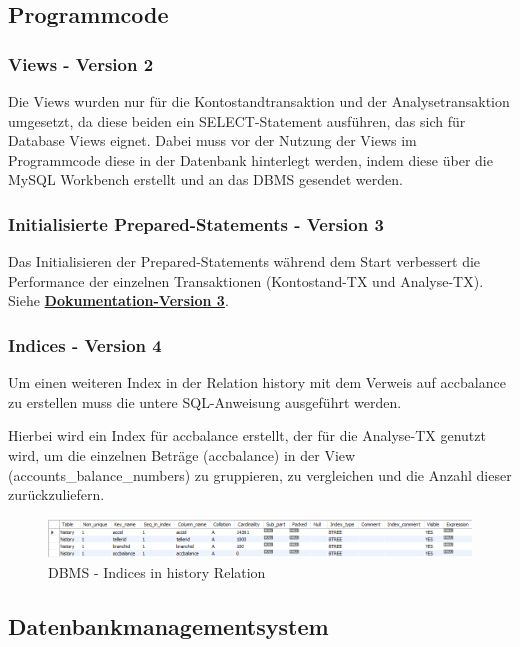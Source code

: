 \subsection{Programmcode}\label{subsec:programmcode}
\subsubsection{Views - Version 2}
Die Views wurden nur für die Kontostandtransaktion und der Analysetransaktion umgesetzt, da diese beiden ein SELECT-Statement ausführen, das sich für Database Views eignet.
Dabei muss vor der Nutzung der Views im Programmcode diese in der Datenbank hinterlegt werden, indem diese über die MySQL Workbench erstellt und an das DBMS gesendet werden.



\subsubsection{Initialisierte Prepared-Statements - Version 3}
Das Initialisieren der Prepared-Statements während dem Start verbessert die Performance der einzelnen Transaktionen (Kontostand-TX und Analyse-TX).
Siehe \hyperref[subsec:version3]{\textbf{Dokumentation-Version 3}}.

\subsubsection{Indices - Version 4}
Um einen weiteren Index in der Relation history mit dem Verweis auf accbalance zu erstellen muss die untere SQL-Anweisung ausgeführt werden.

Hierbei wird ein Index für accbalance erstellt, der für die Analyse-TX genutzt wird, um die einzelnen Beträge (accbalance) in der View (accounts\_balance\_numbers) zu gruppieren, zu vergleichen und die Anzahl dieser zurückzuliefern.

\begin{figure}[h!]
    \center
    \includegraphics[width=\linewidth]{assets/img/database-history-indices}
    \caption{DBMS - Indices in history Relation}
    \label{fig:database-indices-history}
\end{figure}
\begin{center}

\end{center}
\subsection{Datenbankmanagementsystem}\label{subsec:datenbankmanagementsystem}